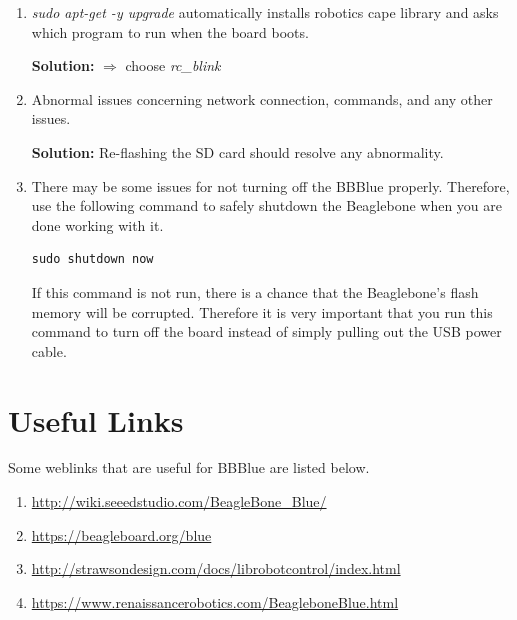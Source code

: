 \begin{enumerate}[\emph{T\#}1:]
\item \emph{sudo apt-get -y upgrade}  automatically installs robotics cape library and asks which program to run when the board boots. \label{trst:problem4}

    \textbf{Solution:}  $\Rightarrow$ choose \emph{rc\_blink}
    
\item Abnormal issues concerning network connection, commands, and any other issues. \label{trst:problem1}
    
    \textbf{Solution:}  Re-flashing the SD card should resolve any abnormality.

    
  \item There may be some issues for not turning off the BBBlue properly. Therefore, use the following command to safely shutdown the Beaglebone when you are done working with it.

\begin{verbatim}
sudo shutdown now
\end{verbatim}
    If this command is not run, there is a chance that the Beaglebone's flash memory will be corrupted. Therefore it is very important that you run this command to turn off the board instead of simply pulling out the USB power cable.

\end{enumerate}

\section{Useful Links}
\label{sec:useful-links}

Some weblinks that are useful for BBBlue are listed below. 

\begin{enumerate}
\item \href{http://wiki.seeedstudio.com/BeagleBone_Blue/}{http://wiki.seeedstudio.com/BeagleBone\_Blue/}
  
\item \href{https://beagleboard.org/blue}{https://beagleboard.org/blue}
  
\item \href{http://strawsondesign.com/docs/librobotcontrol/index.html}{http://strawsondesign.com/docs/librobotcontrol/index.html}
  
\item \href{https://www.renaissancerobotics.com/BeagleboneBlue.html}{https://www.renaissancerobotics.com/BeagleboneBlue.html}
\end{enumerate}



